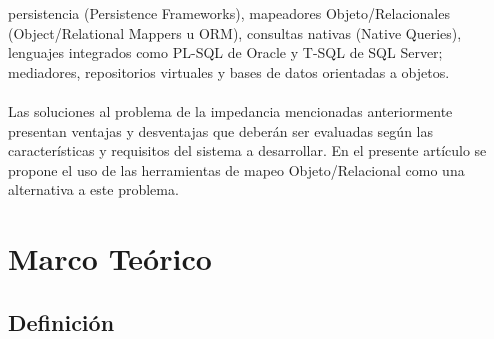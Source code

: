 \documentclass[preprint,12pt]{elsarticle}
\begin{document}
persistencia (Persistence Frameworks), mapeadores Objeto/Relacionales (Object/Relational Mappers u
ORM), consultas nativas (Native Queries), lenguajes integrados como PL-SQL de Oracle y T-SQL de SQL
Server; mediadores, repositorios virtuales y bases de datos orientadas a objetos.
\\
\\
Las soluciones al problema de la impedancia mencionadas anteriormente presentan ventajas y
desventajas que deberán ser evaluadas según las características y requisitos del sistema a desarrollar. En
el presente artículo se propone el uso de las herramientas de mapeo Objeto/Relacional como una
alternativa a este problema.

\section{Marco Teórico}

\subsection{Definición}
\end{document}
